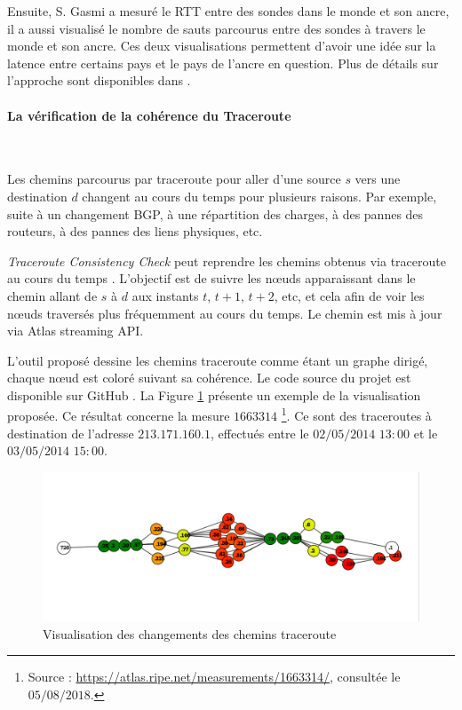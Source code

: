 Ensuite, S. Gasmi a mesuré le RTT entre des sondes dans le monde et son ancre, il a aussi visualisé le nombre de sauts parcourus entre des sondes à travers le monde et son ancre. Ces deux visualisations permettent d'avoir une idée sur la latence entre certains pays et le pays de l'ancre en question. Plus de détails sur l'approche sont disponibles dans \cite{Salim-Gasmi}.
\paragraph{La vérification de la cohérence du Traceroute}~

Les chemins parcourus par traceroute pour aller d'une source $s$ vers une destination $d$ changent au cours du temps pour plusieurs raisons. Par exemple, suite   à un changement BGP, à une  répartition des charges, à des pannes des routeurs,  à des pannes des liens physiques, etc.

\textit{Traceroute Consistency Check} peut reprendre les chemins obtenus via traceroute au cours du temps . L'objectif est de suivre les  n\oe{}uds apparaissant dans le chemin allant de  $s$ à $d$ aux instants $t$, $t+1$, $t+2$, etc, et cela afin de voir les n\oe{}uds traversés plus fréquemment au cours du temps. Le chemin est mis à jour via Atlas streaming API. 

L'outil proposé dessine les chemins traceroute comme étant un graphe dirigé, chaque n\oe{}ud est coloré suivant sa cohérence. Le code source du projet est disponible sur GitHub \cite{Traceroute-consistency-check}. La Figure \ref{fig:Traceroute-consistency-check} présente un exemple de la visualisation proposée. Ce résultat concerne la mesure $1663314$ \footnote{Source : \url{https://atlas.ripe.net/measurements/1663314/}, consultée le $05/08/2018$.}. Ce sont des traceroutes à destination de l'adresse $213.171.160.1$, effectués entre le $02/05/2014$ $13:00$ et le $03/05/2014$ $15:00$.

\begin{figure}[h]
	\centering
	\includegraphics[width=1\linewidth]{illustrations/traceroute-consitance.png}
	\caption{Visualisation des changements des chemins traceroute \cite{Traceroute-consistency-check}}
	\label{fig:Traceroute-consistency-check}
\end{figure}

